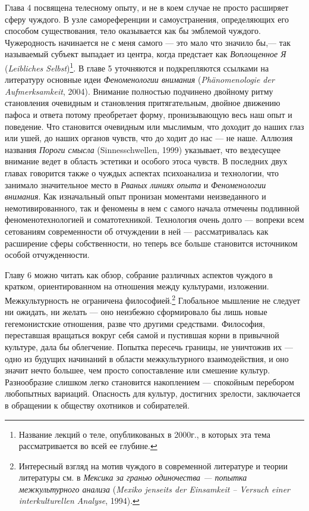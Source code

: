 \documentclass[12pt]{book}
\begin{document}
Глава 4 посвящена телесному опыту, и не в коем случае не просто расширяет сферу чуждого. В узле самореференции и самоустранения, определяющих его способом существования, тело оказывается как бы эмблемой чуждого. Чужеродность начинается не с меня самого --- это мало что значило бы,--- так называемый субъект выпадает из центра, когда предстает как \textit{Воплощенное Я} (\textit{Leibliches Selbst})\footnote{Название лекций о теле, опубликованых в 2000г., в которых эта тема рассматривается во всей ее глубине.}. В главе 5 уточняются и подкрепляются ссылками на литературу основные идеи \textit{Феноменологии внимания} (\textit{Phänomenologie der Aufmerksamkeit}, 2004). Внимание полностью подчинено двойному ритму становления очевидным и становления притягательным, двойное движению пафоса и ответа потому преобретает форму, пронизывающую весь наш опыт и поведение. Что становится очевидным или мыслимым, что доходит до наших глаз или ушей, до наших органов чувств, что до ходит до нас --- не наше. Аллюзия названия \textit{Пороги смысла} (Sinnesschwellen, 1999) указывает, что вездесущее внимание ведет в область эстетики и особого этоса чувств. В последних двух главах говорится также о чуждых аспектах психоанализа и технологии, что занимало значительное место в \textit{Рваных линиях опыта} и \textit{Феноменологии внимания}. Как изначальный опыт пронизан моментами неизведанного и немотивированного, так и феномены в нем с самого начала отмечены подлинной феноменотехнологией и соматотехникой. Технология очень долго --- вопреки всем сетованиям современности об отчуждении в ней --- рассматривалась как расширение сферы собственности, но теперь все больше становится источником особой отчужденности.

Главу 6 можно читать как обзор, собрание различных аспектов чуждого в кратком, ориентированном на отношения между культурами, изложении. Межкультурность не ограничена философией.\footnote{Интересный взгляд на мотив чуждого в современной литературе и теории литературы см. в \textit{Мексика за гранью одиночества --- попытка межкультурного анализа} (\textit{Mexiko jenseits der Einsamkeit -- Versuch einer interkulturellen Analyse}, 1994).} Глобальное мышление не следует ни ожидать, ни желать --- оно неизбежно сформировало бы лишь новые гегемонистские отношения, разве что другими средствами. Философия, переставшая вращаться вокруг себя самой и пустившая корни в привычной культуре, дала бы облегчение. Попытка пересечь границы, не уничтожив их --- одно из будущих начинаний в области межкультурного взаимодействия, и оно значит нечто большее, чем просто сопоставление или смешение культур. Разнообразие слишком легко становится накоплением --- спокойным перебором любопытных вариаций. Опасность для культур, достигних зрелости, заключается в обращении к обществу охотников и собирателей.
\end{document}
